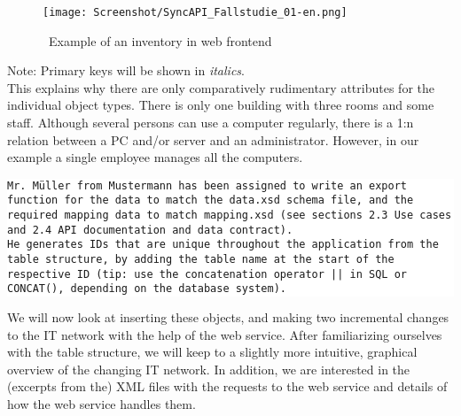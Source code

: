 \documentclass[a4paper,10pt]{book}
\begin{document}
\newline
\begin{figure}[htb!]
  \centering
  \texttt{[image: Screenshot/SyncAPI\_Fallstudie\_01-en.png]}
  \caption{\label{Example of an inventory in web frontend} \ Example of an inventory in web frontend}
\end{figure}
\newline
Note: Primary keys will be shown in \textit{italics}.
\newline\\
This explains why there are only comparatively rudimentary attributes for the individual object types. There is
only one building with three rooms and some staff. Although several persons can use a computer regularly, there is
a 1:n relation between a PC and/or server and an administrator. However, in our example a single employee manages
all the computers.
\newline\newline
\colorbox{white}{\parbox{\textwidth}{
{\tt Mr. Müller from Mustermann has been assigned to write an export function for the data to match the data.xsd
schema file, and the required mapping data to match mapping.xsd (see sections 2.3 Use cases and 2.4 API documentation
and data contract).
\newline\\
He generates IDs that are unique throughout the application from the table structure, by adding the table name at the
start of the respective ID (tip: use the concatenation operator || in SQL or CONCAT(), depending on the database system).}
}}
\newline\newline
We will now look at inserting these objects, and making two incremental changes to the IT network with the help of
the web service. After familiarizing ourselves with the table structure, we will keep to a slightly more intuitive,
graphical overview of the changing IT network. In addition, we are interested in the (excerpts from the) XML files
with the requests to the web service and details of how the web service handles them.
\end{document}
